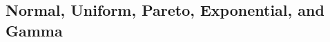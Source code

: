 \documentclass[english]{article}
\begin{document}
\begin{multicols*}{2}
\subsection{Normal, Uniform, Pareto, Exponential, and Gamma}\label{subsec:0gaExpNoDistr}
%
%
%
%
%

\end{multicols*}
\end{document}
